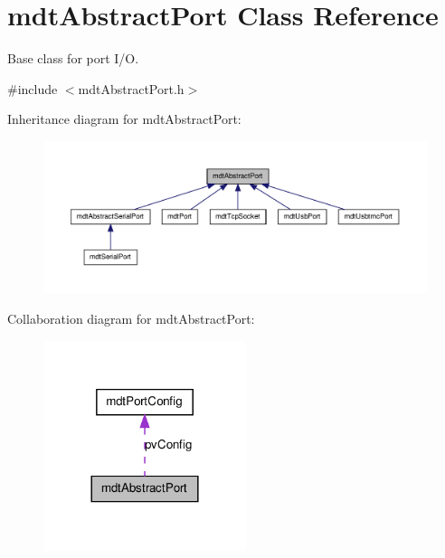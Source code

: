 \hypertarget{classmdt_abstract_port}{
\section{mdtAbstractPort Class Reference}
\label{classmdt_abstract_port}
}


Base class for port I/O.  




{\ttfamily \#include $<$mdtAbstractPort.h$>$}



Inheritance diagram for mdtAbstractPort:\nopagebreak
\begin{figure}[H]
\begin{center}
\leavevmode
\includegraphics[width=400pt]{classmdt_abstract_port__inherit__graph}
\end{center}
\end{figure}


Collaboration diagram for mdtAbstractPort:\nopagebreak
\begin{figure}[H]
\begin{center}
\leavevmode
\includegraphics[width=168pt]{classmdt_abstract_port__coll__graph}
\end{center}
\end{figure}
